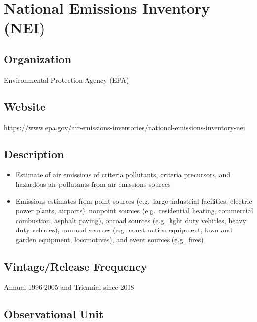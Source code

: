\documentclass[
]{book}
\providecommand{\tightlist}{%
  \setlength{\itemsep}{0pt}\setlength{\parskip}{0pt}}
\begin{document}
\mainmatter

\hypertarget{national-emissions-inventory-nei}{%
\chapter{National Emissions Inventory (NEI)}\label{national-emissions-inventory-nei}}

\hypertarget{organization-47}{%
\section{Organization}\label{organization-47}}

Environmental Protection Agency (EPA)

\hypertarget{website-47}{%
\section{Website}\label{website-47}}

\url{https://www.epa.gov/air-emissions-inventories/national-emissions-inventory-nei}

\hypertarget{description-47}{%
\section{Description}\label{description-47}}

\begin{itemize}
\tightlist
\item
  Estimate of air emissions of criteria pollutants, criteria precursors, and hazardous air pollutants from air emissions sources
\item
  Emissions estimates from point sources (e.g.~large industrial facilities, electric power plants, airports), nonpoint sources (e.g.~residential heating, commercial combustion, asphalt paving), onroad sources (e.g.~light duty vehicles, heavy duty vehicles), nonroad sources (e.g.~construction equipment, lawn and garden equipment, locomotives), and event sources (e.g.~fires)
\end{itemize}

\hypertarget{vintagerelease-frequency-47}{%
\section{Vintage/Release Frequency}\label{vintagerelease-frequency-47}}

Annual 1996-2005 and Triennial since 2008

\hypertarget{observational-unit-47}{%
\section{Observational Unit}\label{observational-unit-47}}
\end{document}
